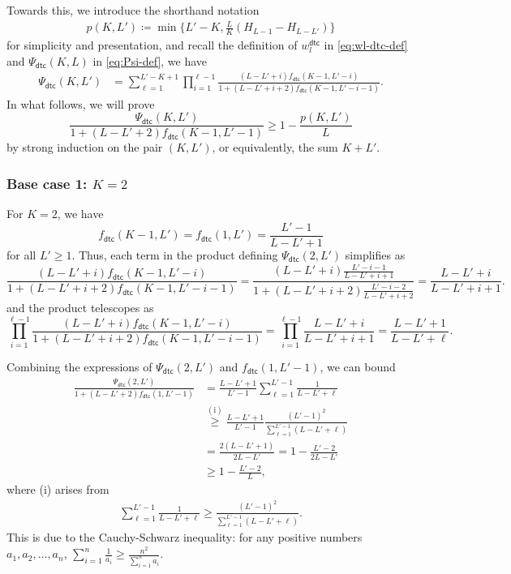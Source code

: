 \documentclass[english]{article}
\newcommand{\defn}{\coloneqq}
\newcommand{\numpf}[2]{\overset{(\mathrm{#1})}{#2}}
\newcommand{\dtc}{\mathsf{dtc}}
\begin{document}
Towards this, we introduce the shorthand notation
\begin{align}\label{eq:p-def}
    p(K, L') \defn \min \Big\{L'-K, \frac{L}{K}(H_{L-1} - H_{L-L'} ) \Big\}
\end{align}
for simplicity and presentation, and recall the definition of $ w_l^{\dtc} $ in \eqref{eq:wl-dtc-def} and $\Psi_\dtc(K, L)$ in \eqref{eq:Psi-def}, we have
\begin{align*}
\Psi_\dtc(K, L') &= \sum_{\ell = 1}^{L'-K+1} \prod_{i=1}^{\ell - 1} \frac{(L-L'+i)f_\dtc(K-1, L'-i)}{1 + (L-L'+i+2)f_\dtc(K-1, L'-i-1)}.
\end{align*}
In what follows, we will prove $$ \frac{\Psi_\dtc(K, L')}{1 + (L-L'+2)f_\dtc(K-1, L'-1)} \geq 1 - \frac{p(K, L')}{L} $$  by strong induction on the pair $(K, L')$, or equivalently, the sum $K + L'$.


\subsubsection{Base case 1: $K = 2$}
For $K = 2$, we have $$f_\dtc(K-1, L') = f_\dtc(1, L') = \frac{L'-1}{L-L'+1}$$ for all $L' \geq 1$. Thus, each term in the product defining $\Psi_\dtc(2, L')$ simplifies as
\[
    \frac{(L-L'+i)f_\dtc(K-1, L'-i)}{1 + (L-L'+i+2)f_\dtc(K-1, L'-i-1)} = \frac{(L-L'+i)\frac{L'-i-1}{L-L'+i+1}}{1 + (L-L'+i+2)\frac{L'-i-2}{L-L'+i+2}} = \frac{L-L'+i}{L-L'+i+1}.
\]
and the product telescopes as
\[
    \prod_{i=1}^{\ell - 1} \frac{(L-L'+i)f_\dtc(K-1, L'-i)}{1 + (L-L'+i+2)f_\dtc(K-1, L'-i-1)} = \prod_{i=1}^{\ell - 1} \frac{L-L'+i}{L-L'+i+1} = \frac{L-L'+1}{L-L'+\ell}.
\]

Combining the expressions of $\Psi_\dtc(2, L')$ and $f_\dtc(1, L'-1)$, we can bound
\begin{align*}
\frac{\Psi_\dtc(2, L')}{1 + (L-L'+2)f_\dtc(1, L'-1)} &= \frac{L-L'+1}{L'-1} \sum_{\ell = 1}^{L'-1} \frac{1}{L-L'+\ell} \\ 
& \numpf{i}{\geq} \frac{L-L'+1}{L'-1} \frac{(L'-1)^2}{\sum_{\ell = 1}^{L'-1} (L-L'+\ell)} \\
&= \frac{2(L-L'+1)}{2L - L'} = 1 - \frac{L'-2}{2L-L'} \\
&\geq 1 - \frac{L'-2}{L}, 
\end{align*}
where (i) arises from 
\begin{align}\label{eq:cs-1}
\sum_{\ell = 1}^{L'-1} \frac{1}{L-L'+\ell} \geq \frac{(L'-1)^2}{\sum_{\ell = 1}^{L'-1} (L-L'+\ell)}.
\end{align}
This is due to the Cauchy-Schwarz inequality: for any positive numbers $a_1, a_2, \ldots, a_n$, $\sum_{i=1}^n \frac{1}{a_i} \geq \frac{n^2}{\sum_{i=1}^n a_i}$.
\end{document}
